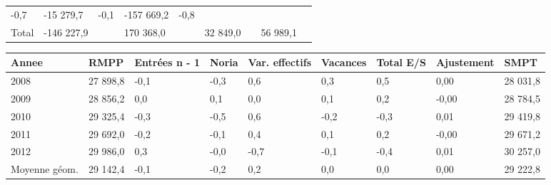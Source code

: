 \begin{longtable}[]{@{}lllllllll@{}}
\begin{minipage}[t]{0.06\columnwidth}
-0,7\strut
\end{minipage} & \begin{minipage}[t]{0.12\columnwidth}\raggedright
-15 279,7\strut
\end{minipage} & \begin{minipage}[t]{0.06\columnwidth}\raggedright
-0,1\strut
\end{minipage} & \begin{minipage}[t]{0.09\columnwidth}\raggedright
-157 669,2\strut
\end{minipage} & \begin{minipage}[t]{0.06\columnwidth}\raggedright
-0,8\strut
\end{minipage}\tabularnewline
\begin{minipage}[t]{0.05\columnwidth}\raggedright
Total\strut
\end{minipage} & \begin{minipage}[t]{0.10\columnwidth}\raggedright
-146 227,9\strut
\end{minipage} & \begin{minipage}[t]{0.06\columnwidth}\raggedright
\strut
\end{minipage} & \begin{minipage}[t]{0.16\columnwidth}\raggedright
170 368,0\strut
\end{minipage} & \begin{minipage}[t]{0.06\columnwidth}\raggedright
\strut
\end{minipage} & \begin{minipage}[t]{0.12\columnwidth}\raggedright
32 849,0\strut
\end{minipage} & \begin{minipage}[t]{0.06\columnwidth}\raggedright
\strut
\end{minipage} & \begin{minipage}[t]{0.09\columnwidth}\raggedright
56 989,1\strut
\end{minipage} & \begin{minipage}[t]{0.06\columnwidth}\raggedright
\strut
\end{minipage}\tabularnewline
\bottomrule
\end{longtable}

\begin{longtable}[]{@{}lllllllll@{}}
\toprule
Annee & RMPP & Entrées n - 1 & Noria & Var. effectifs & Vacances & Total
E/S & Ajustement & SMPT\tabularnewline
\midrule
\endhead
2008 & 27 898,8 & -0,1 & -0,3 & 0,6 & 0,3 & 0,5 & 0,00 & 28
031,8\tabularnewline
2009 & 28 856,2 & 0,0 & 0,1 & 0,0 & 0,1 & 0,2 & -0,00 & 28
784,5\tabularnewline
2010 & 29 325,4 & -0,3 & -0,5 & 0,6 & -0,2 & -0,3 & 0,01 & 29
419,8\tabularnewline
2011 & 29 692,0 & -0,2 & -0,1 & 0,4 & 0,1 & 0,2 & -0,00 & 29
671,2\tabularnewline
2012 & 29 986,0 & 0,3 & -0,0 & -0,7 & -0,1 & -0,4 & 0,01 & 30
257,0\tabularnewline
Moyenne géom. & 29 142,4 & -0,1 & -0,2 & 0,2 & 0,0 & 0,0 & 0,00 & 29
222,8\tabularnewline
\bottomrule
\end{longtable}

